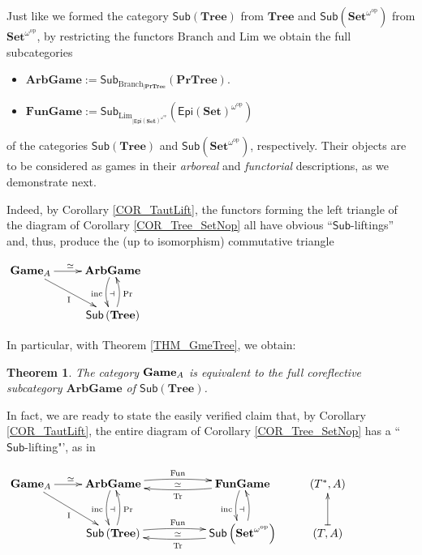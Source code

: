 \documentclass[12pt]{amsart}
\newtheorem{thm}{Theorem}[section]
\theoremstyle{definition}
\newcommand{\A}{\textup{\textmd{\textsc{A}}}}
\newcommand{\Sets}{\mathbf{Set}}
\newcommand{\Tree}{\mathbf{Tree}}
\newcommand{\PrTree}{\mathbf{PrTree}}
\newcommand{\TrGame}{\mathbf{ArbGame}}
\newcommand{\Games}{\mathbf{Game}}
\newcommand{\FunGame}{\mathbf{FunGame}}
\newcommand{\SetNop}{\Sets^{\omega^{\op}}}
\newcommand{\Sub}[1]{\mathsf{Sub}\left({#1}\right)}
\newcommand{\op}{\mathrm{op}}
\begin{document}
Just like we formed the category $\Sub{\Tree}$ from $\Tree$ and $\mathsf{Sub}(\SetNop)$ from $\SetNop$, by restricting the functors $\mathrm{Branch}$ and $\mathrm{Lim}$ we obtain the full subcategories
\begin{itemize}
	\item $\TrGame:=\mathsf{Sub}_{\mathrm{Branch}_{|\PrTree}}(\PrTree).$
	\item $\FunGame:=\mathsf{Sub}_{\mathrm{Lim}_{|\mathsf{Epi}(\Sets)^{\omega^{\op}}}}(\mathsf{Epi}(\Sets)^{\omega^{\mathrm{op}}})$
\end{itemize}
of the categories $\Sub{\Tree}$ and $\mathsf{Sub}(\SetNop)$, respectively. Their objects are to be considered as games in their \textit{arboreal} and \textit{functorial} descriptions, as we demonstrate next.

Indeed, by Corollary \ref{COR_TautLift}, the functors forming the left triangle of the diagram of Corollary \ref{COR_Tree_SetNop} all have obvious ``$\mathsf{Sub}$-liftings'' and, thus, produce the (up to isomorphism) commutative triangle
\begin{center}
	$\xymatrix{\Games_\A\ar[r]^{\simeq\;}\ar[rd]_{\mathrm{I}} & \TrGame\ar@/_0.5pc/[d]_{\mathrm{inc}}^{\dashv}\\
		& \Sub{\Tree} \ar@/_0.5pc/[u]_{\mathrm{Pr}} \\
	}$
\end{center}
In particular, with Theorem
\ref{THM_GmeTree}, we obtain:

\begin{thm}\label{THM_Graphs&Games}
	The category $\Games_\A$ is equivalent to the full coreflective subcategory $\TrGame$ of $\Sub{\Tree}$.
\end{thm}

In fact, we are ready to state the easily verified claim that, by Corollary \ref{COR_TautLift}, the entire diagram of Corollary  \ref{COR_Tree_SetNop} has a ``$\mathsf{Sub}$-lifting"', as in

\begin{center}
	$\xymatrix{\Games_{\A}\ar[r]^{\simeq\;}\ar[rd]_{\mathrm{I}} & \mathbf{ArbGame}\ar@/_0.5pc/[d]^{\dashv}_{\mathrm{inc}}\ar@/^0.4pc/[rr]^{\mathrm{Fun}} && \mathbf{FunGame}\ar@/_0.5pc/[d]^{\dashv}_{\mathrm{inc}}\ar@/^0.4pc/[ll]_{\simeq}^{\mathrm{Tr}} & (T^*,A)\\
		&\Sub{ \Tree}\ar@/_0.5pc/[u]_{\mathrm{Pr}}\ar@/^0.4pc/[rr]^{\mathrm{Fun}} && \Sub{\SetNop}\ar@/_0.5pc/[u]\ar@/^0.4pc/[ll]_{\simeq}^{\mathrm{Tr}} & (T,A)\ar@{|->}[u] \\	
	}$
\end{center}
\end{document}
